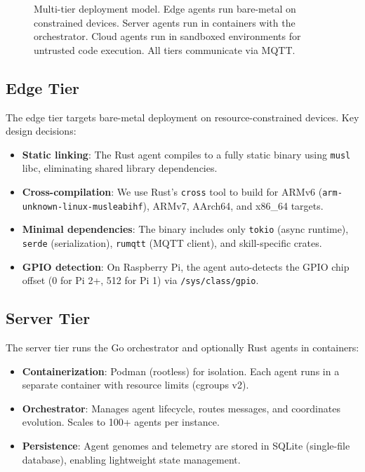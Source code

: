 \documentclass{article}
\begin{document}
\begin{figure}[t]
\caption{Multi-tier deployment model. Edge agents run bare-metal on constrained devices. Server agents run in containers with the orchestrator. Cloud agents run in sandboxed environments for untrusted code execution. All tiers communicate via MQTT.}
\label{fig:deployment_tiers}
\end{figure}


\subsection{Edge Tier}

The edge tier targets bare-metal deployment on resource-constrained devices. Key design decisions:

\begin{itemize}[leftmargin=*]
    \item \textbf{Static linking}: The Rust agent compiles to a fully static binary using \texttt{musl} libc, eliminating shared library dependencies.
    \item \textbf{Cross-compilation}: We use Rust's \texttt{cross} tool to build for ARMv6 (\texttt{arm-unknown-linux-musleabihf}), ARMv7, AArch64, and x86\_64 targets.
    \item \textbf{Minimal dependencies}: The binary includes only \texttt{tokio} (async runtime), \texttt{serde} (serialization), \texttt{rumqtt} (MQTT client), and skill-specific crates.
    \item \textbf{GPIO detection}: On Raspberry Pi, the agent auto-detects the GPIO chip offset (0 for Pi 2+, 512 for Pi 1) via \texttt{/sys/class/gpio}.
\end{itemize}


\subsection{Server Tier}

The server tier runs the Go orchestrator and optionally Rust agents in containers:

\begin{itemize}[leftmargin=*]
    \item \textbf{Containerization}: Podman (rootless) for isolation. Each agent runs in a separate container with resource limits (cgroups v2).
    \item \textbf{Orchestrator}: Manages agent lifecycle, routes messages, and coordinates evolution. Scales to 100+ agents per instance.
    \item \textbf{Persistence}: Agent genomes and telemetry are stored in SQLite (single-file database), enabling lightweight state management.
\end{itemize}
\end{document}
